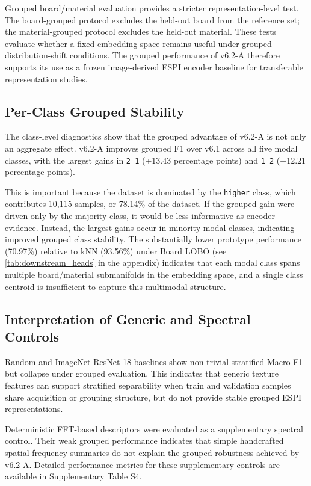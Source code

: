 \documentclass[review,3p,times]{elsarticle}
\begin{document}
Grouped board/material evaluation provides a stricter representation-level test. The board-grouped protocol excludes the held-out board from the reference set; the material-grouped protocol excludes the held-out material. These tests evaluate whether a fixed embedding space remains useful under grouped distribution-shift conditions. The grouped performance of v6.2-A therefore supports its use as a frozen image-derived ESPI encoder baseline for transferable representation studies.

\subsection{Per-Class Grouped Stability}
The class-level diagnostics show that the grouped advantage of v6.2-A is not only an aggregate effect. v6.2-A improves grouped F1 over v6.1 across all five modal classes, with the largest gains in \texttt{2\_1} (+13.43 percentage points) and \texttt{1\_2} (+12.21 percentage points).

This is important because the dataset is dominated by the \texttt{higher} class, which contributes 10,115 samples, or 78.14\% of the dataset. If the grouped gain were driven only by the majority class, it would be less informative as encoder evidence. Instead, the largest gains occur in minority modal classes, indicating improved grouped class stability. The substantially lower prototype performance (70.97\%) relative to kNN (93.56\%) under Board LOBO (see \cref{tab:downstream_heads} in the appendix) indicates that each modal class spans multiple board/material submanifolds in the embedding space, and a single class centroid is insufficient to capture this multimodal structure.

\subsection{Interpretation of Generic and Spectral Controls}
Random and ImageNet ResNet-18 baselines show non-trivial stratified Macro-F1 but collapse under grouped evaluation. This indicates that generic texture features can support stratified separability when train and validation samples share acquisition or grouping structure, but do not provide stable grouped ESPI representations.

Deterministic FFT-based descriptors were evaluated as a supplementary spectral control. Their weak grouped performance indicates that simple handcrafted spatial-frequency summaries do not explain the grouped robustness achieved by v6.2-A. Detailed performance metrics for these supplementary controls are available in Supplementary Table S4.
\end{document}
